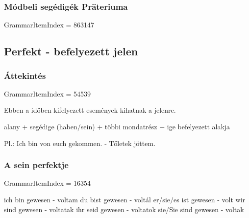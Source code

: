 \documentclass{article}
\newenvironment{desc}{\verbatim}{\endverbatim}
\newenvironment{exmp}{\verbatim}{\endverbatim}
\begin{document}
\subsubsection{Módbeli segédigék Präteriuma}

GrammarItemIndex = 863147

\begin{desc}
\end{desc}

\begin{exmp}
\end{exmp}

\subsection{Perfekt - befelyezett jelen}

\subsubsection{Áttekintés}

GrammarItemIndex = 54539

\begin{desc}
Ebben a időben kifelyezett események kihatnak a jelenre.
\begin{center}
alany + segédige (haben/sein) + többi mondatrész + ige befelyezett alakja
\end{center}

Pl.: Ich bin von euch gekommen. - Tőletek jöttem.
\end{desc}

\begin{exmp}
\end{exmp}

\subsubsection{A sein perfektje}

GrammarItemIndex = 16354

\begin{desc}
ich bin gewesen - voltam
du bist gewesen - voltál
er/sie/es ist gewesen - volt
wir sind gewesen - voltatak
ihr seid gewesen - voltatok
sie/Sie sind gewesen - voltak
\end{desc}
\end{document}
